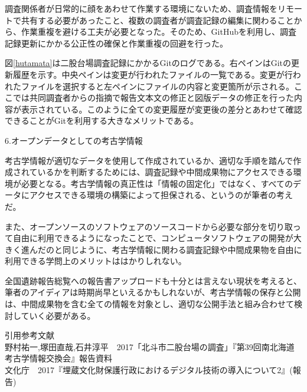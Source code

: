 \documentclass[9pt,b5j,papersize]{jsarticle}
\begin{document}
\begin{multicols}{2}
調査関係者が日常的に顔をあわせて作業する環境にないため、調査情報をリモートで共有する必要があったこと、複数の調査者が調査記録の編集に関わることから、作業重複を避ける工夫が必要となった。そのため、GitHubを利用し、調査記録更新にかかる公正性の確保と作業重複の回避を行った。

図\ref{hutamata}は二股台場調査記録にかかるGitのログである。右ペインはGitの更新履歴を示す。中央ペインは変更が行われたファイルの一覧である。変更が行われたファイルを選択すると左ペインにファイルの内容と変更箇所が示される。ここでは共同調査者からの指摘で報告文本文の修正と図版データの修正を行った内容が表示されている。このように全ての変更履歴が変更後の差分とあわせて確認できることがGitを利用する大きなメリットである。

\noindent
{\large 6.オープンデータとしての考古学情報}

考古学情報が適切なデータを使用して作成されているか、適切な手順を踏んで作成されているかを判断するためには、調査記録や中間成果物にアクセスできる環境が必要となる。考古学情報の真正性は「情報の固定化」ではなく、すべてのデータにアクセスできる環境の構築によって担保される、というのが筆者の考えだ。

また、オープンソースのソフトウェアのソースコードから必要な部分を切り取って自由に利用できるようになったことで、コンピュータソフトウェアの開発が大きく進んだのと同じように、考古学情報に関わる調査記録や中間成果物を自由に利用できる学問上のメリットははかりしれない。

全国遺跡報告総覧への報告書アップロードも十分とは言えない現状を考えると、筆者のアイディアは時期尚早といえるかもしれないが、考古学情報の保存と公開は、中間成果物を含む全ての情報を対象とし、適切な公開手法と組み合わせて検討していく必要がある。

\vspace{1\baselineskip}
\noindent
引用参考文献\\
野村祐一,塚田直哉,石井淳平　2017「北斗市二股台場の調査」『第39回南北海道考古学情報交換会』報告資料\\
文化庁　2017『埋蔵文化財保護行政におけるデジタル技術の導入について2』(報告)\\

\end{multicols}
\end{document}

